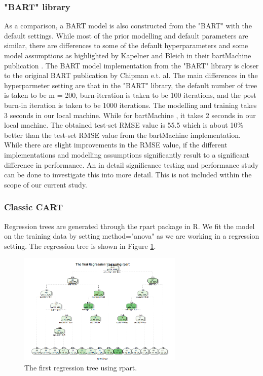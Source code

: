 \documentclass{usiinftr}
\begin{document}
\subsubsection{"BART" library}
As a comparison, a BART model is also constructed from the "BART" with the default settings. While most of the prior modelling and default parameters are similar, there are differences to some of the default hyperparameters and some model assumptions as highlighted by Kapelner and Bleich in their bartMachine publication \cite{}. The BART model implementation from the "BART" library is closer to the original BART publication by Chipman e.t. al. The main differences in the hyperparmeter setting are that in the "BART" library, the default number of tree is taken to be m = 200, burn-iteration is taken to be 100 iterations, and the post burn-in iteration is taken to be 1000 iterations. The modelling and training takes 3 seconds in our local machine. While for bartMachine , it takes 2 seconds in our local machine. The obtained test-set RMSE value is 55.5 which is about 10\% better than the test-set RMSE value from the bartMachine implementation. While there are slight improvements in the RMSE value, if the different implementations and modelling assumptions significantly result to a significant difference in performance. An in detail significance testing and performance study can be done to investigate this into more detail. This is not included within the scope of our current study.

\subsubsection{Classic CART}
Regression trees are generated through the rpart package in R. We fit the model on the training data by setting method="anova" as we are working in a regression setting. The regression tree is shown in Figure \ref{CART1}. 

\begin{figure}[h!] 
\centering
\includegraphics[width=0.7\textwidth]{images/image107.png}
\caption{The first regression tree using rpart.}
\label{CART1}
\end{figure}
\end{document}
